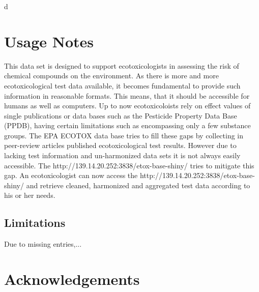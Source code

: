 d\documentclass[english]{article}
\newcommand{\epa}{EPA ECOTOX data base}
\newcommand{\app}{http://139.14.20.252:3838/etox-base-shiny/}
\begin{document}
\section*{Usage Notes}
This data set is designed to support ecotoxicologists in assessing the risk of chemical compounds on the environment. As there is more and more ecotoxicological test data available, it becomes fundamental to provide such information in reasonable formats. This means, that it should be accessible for humans as well as computers. Up to now ecotoxicoloists rely on effect values of single publications or data bases such as the Pesticide Property Data Base (PPDB), having certain limitations such as encompassing only a few substance groups. The \epa{} tries to fill these gaps by collecting in peer-review articles published ecotoxicological test results. However due to lacking test information and un-harmonized data sets it is not always easily accessible. The \app{} tries to mitigate this gap. An ecotoxicologist can now access the \app{} and retrieve cleaned, harmonized and aggregated test data according to his or her needs.

\subsection*{Limitations}
Due to missing entries,... 


\section*{Acknowledgements}
\end{document}

